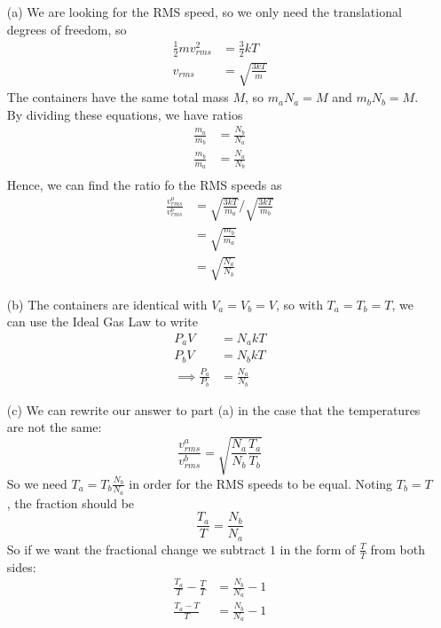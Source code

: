 \documentclass{article}
\begin{document}
\begin{itemize}
	\item[(a)] We are looking for the RMS speed, so we only need the translational degrees of freedom, so
	\begin{align*}
	\frac{1}{2}mv_{rms}^2 &= \frac{3}{2}kT \\
	v_{rms} &= \sqrt{\frac{3kT}{m}}
	\end{align*}
	The containers have the same total mass $M$, so $m_aN_a = M$ and $m_bN_b = M$. By dividing these equations, we have ratios
	\begin{align*}
	\frac{m_a}{m_b} &= \frac{N_b}{N_a} \\
	\frac{m_b}{m_a} &= \frac{N_a}{N_b} \\
	\end{align*}
	Hence, we can find the ratio fo the RMS speeds as
	\begin{align*}
	\frac{v_{rms}^a}{v_{rms}^b} &= \sqrt{\frac{3kT}{m_a}}/\sqrt{\frac{3kT}{m_b}} \\
	&= \sqrt{\frac{m_b}{m_a}} \\
	&= \sqrt{\frac{N_a}{N_b}}
	\end{align*}
	\item[(b)] The containers are identical with $V_a = V_b = V$, so with $T_a = T_b = T$, we can use the Ideal Gas Law to write
	\begin{align*}
	P_a V &= N_a k T \\
	P_b V &= N_b k T \\
	\implies \frac{P_a}{P_b} &= \frac{N_a}{N_b}
	\end{align*}
	\item[(c)] We can rewrite our answer to part (a) in the case that the temperatures are not the same:
	\begin{equation}
	\frac{v_{rms}^a}{v_{rms}^b} = \sqrt{\frac{N_a}{N_b}\frac{T_a}{T_b}}
	\end{equation}
	So we need $T_a = T_b\frac{N_b}{N_a}$ in order for the RMS speeds to be equal. Noting $T_b = T$, the fraction should be
	\begin{equation}
	\frac{T_a}{T} = \frac{N_b}{N_a}
	\end{equation}
	So if we want the fractional change we subtract $1$ in the form of $\frac{T}{T}$ from both sides:
	\begin{align*}
	\frac{T_a}{T}-\frac{T}{T} &= \frac{N_b}{N_a}-1 \\
	\frac{T_a-T}{T} &= \frac{N_b}{N_a}-1
	\end{align*}
\end{itemize}
\end{document}
